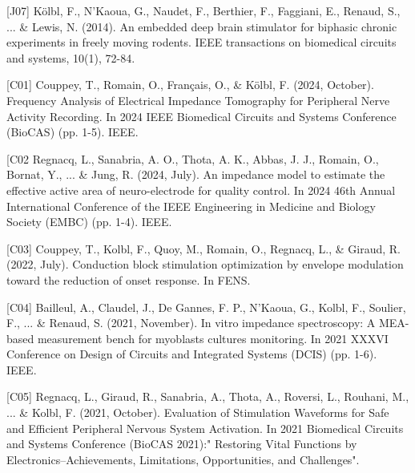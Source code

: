   \begin{cvskills}    
    \cvskill
      {[J07]}
      {Kölbl, F., N'Kaoua, G., Naudet, F., Berthier, F., Faggiani, E., Renaud, S., ... \& Lewis, N. (2014). An embedded deep brain stimulator for biphasic chronic experiments in freely moving rodents. IEEE transactions on biomedical circuits and systems, 10(1), 72-84.}
  \end{cvskills}

\begin{cvskills}
  \cvskill
  {[C01]} %
  {Couppey, T., Romain, O., Français, O., \& Kölbl, F. (2024, October). Frequency Analysis of Electrical Impedance Tomography for Peripheral Nerve Activity Recording. In 2024 IEEE Biomedical Circuits and Systems Conference (BioCAS) (pp. 1-5). IEEE.}
\end{cvskills}
\begin{cvskills}
  \cvskill
    {[C02} %
    {Regnacq, L., Sanabria, A. O., Thota, A. K., Abbas, J. J., Romain, O., Bornat, Y., ... \& Jung, R. (2024, July). An impedance model to estimate the effective active area of neuro-electrode for quality control. In 2024 46th Annual International Conference of the IEEE Engineering in Medicine and Biology Society (EMBC) (pp. 1-4). IEEE.} %
\end{cvskills}  
\begin{cvskills}
  \cvskill
    {[C03]} %
    {Couppey, T., Kolbl, F., Quoy, M., Romain, O., Regnacq, L., \& Giraud, R. (2022, July). Conduction block stimulation optimization by envelope modulation toward the reduction of onset response. In FENS.} %
\end{cvskills}  
\begin{cvskills}
  \cvskill
    {[C04]} %
    {Bailleul, A., Claudel, J., De Gannes, F. P., N'Kaoua, G., Kolbl, F., Soulier, F., ... \& Renaud, S. (2021, November). In vitro impedance spectroscopy: A MEA-based measurement bench for myoblasts cultures monitoring. In 2021 XXXVI Conference on Design of Circuits and Integrated Systems (DCIS) (pp. 1-6). IEEE.} %
\end{cvskills}  
\begin{cvskills}    
  \cvskill
    {[C05]} %
    {Regnacq, L., Giraud, R., Sanabria, A., Thota, A., Roversi, L., Rouhani, M., ... \& Kolbl, F. (2021, October). Evaluation of Stimulation Waveforms for Safe and Efficient Peripheral Nervous System Activation. In 2021 Biomedical Circuits and Systems Conference (BioCAS 2021):" Restoring Vital Functions by Electronics–Achievements, Limitations, Opportunities, and Challenges".} %
\end{cvskills}  

